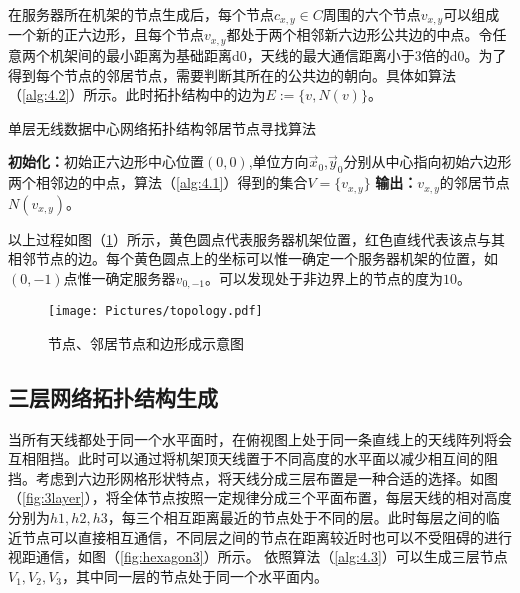 在服务器所在机架的节点生成后，每个节点$c_{x,y}\in C$周围的六个节点$v_{x,y}$可以组成一个新的正六边形，且每个节点$v_{x,y}$都处于两个相邻新六边形公共边的中点。令任意两个机架间的最小距离为基础距离d$0$，天线的最大通信距离小于$3$倍的d$0$。为了得到每个节点的邻居节点，需要判断其所在的公共边的朝向。具体如算法（\ref{alg:4.2}）所示。此时拓扑结构中的边为$E :={\{v,N(v)\} }$。

\begin{algorithm}
	\SetAlgoLined
	\caption{单层无线数据中心网络拓扑结构邻居节点寻找算法} \label{alg:4.2}
	\textbf{初始化：}初始正六边形中心位置$(0,0)$,单位方向$\vec x_0$,$\vec y_0$分别从中心指向初始六边形两个相邻边的中点，算法（\ref{alg:4.1}）得到的集合$V=\{v_{x,y}\}$\;
	{
	}
	\textbf{输出：}$v_{x,y}$的邻居节点$N(v_{x,y})$。
\end{algorithm}

以上过程如图（\ref{fig:topology}）所示，黄色圆点代表服务器机架位置，红色直线代表该点与其相邻节点的边。每个黄色圆点上的坐标可以惟一确定一个服务器机架的位置，如$(0,-1)$点惟一确定服务器$v_{0,-1}$。可以发现处于非边界上的节点的度为$10$。

\begin{figure}[htbp]
	\centering
	\texttt{[image: Pictures/topology.pdf]}
	\caption{节点、邻居节点和边形成示意图}
	\label{fig:topology}
\end{figure}

\subsection{三层网络拓扑结构生成}

当所有天线都处于同一个水平面时，在俯视图上处于同一条直线上的天线阵列将会互相阻挡。此时可以通过将机架顶天线置于不同高度的水平面以减少相互间的阻挡。考虑到六边形网格形状特点，将天线分成三层布置是一种合适的选择。如图（\ref{fig:3layer}），将全体节点按照一定规律分成三个平面布置，每层天线的相对高度分别为$h1,h2,h3$，每三个相互距离最近的节点处于不同的层。此时每层之间的临近节点可以直接相互通信，不同层之间的节点在距离较近时也可以不受阻碍的进行视距通信，如图（\ref{fig:hexagon3}）所示。
依照算法（\ref{alg:4.3}）可以生成三层节点$V_1,V_2,V_3$，其中同一层的节点处于同一个水平面内。

